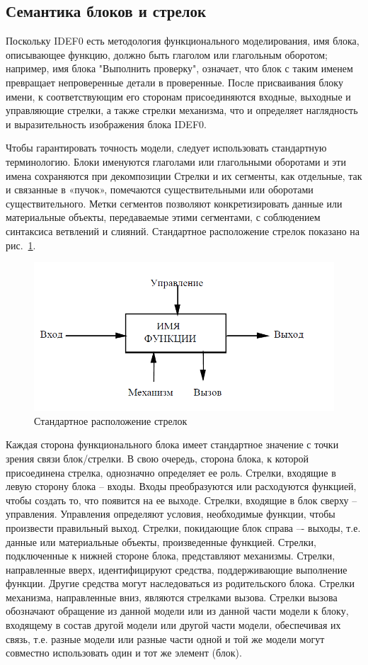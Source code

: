 \documentclass[a4paper, final]{article}
\begin{document}
\subsection{Семантика блоков и стрелок}
Поскольку IDEF0 есть методология функционального моделирования, имя блока, описывающее функцию, должно быть глаголом или глагольным оборотом; например, имя блока "Выполнить проверку", означает, что блок с таким именем превращает непроверенные детали в проверенные. После присваивания блоку имени, к соответствующим его сторонам присоединяются входные, выходные и управляющие стрелки, а также стрелки механизма, что и определяет наглядность и выразительность изображения блока IDEF0. 

Чтобы гарантировать точность модели, следует использовать стандартную
терминологию. Блоки именуются глаголами или глагольными оборотами и эти имена сохраняются при декомпозиции Стрелки и их сегменты, как отдельные, так и связанные в «пучок», помечаются существительными или оборотами существительного. Метки сегментов позволяют конкретизировать данные или материальные объекты, передаваемые этими сегментами, с соблюдением синтаксиса ветвлений и слияний. Стандартное расположение стрелок показано на рис.~\ref{img:semantics}.

\begin{figure}[H]
  \centering
  \includegraphics[width=0.5\linewidth]{semantics.png}
  \caption{Стандартное расположение стрелок}
  \label{img:semantics}
\end{figure}

Каждая сторона функционального блока имеет стандартное значение с точки зрения связи блок/стрелки. В свою очередь, сторона блока, к которой присоединена стрелка, однозначно определяет ее роль. Стрелки, входящие в левую сторону блока -- входы. Входы преобразуются или расходуются функцией, чтобы создать то, что появится на ее выходе. Стрелки, входящие в блок сверху -- управления. Управления определяют условия, необходимые функции, чтобы произвести правильный выход. Стрелки, покидающие блок справа –- выходы, т.е. данные или материальные объекты, произведенные функцией. Стрелки, подключенные к нижней стороне блока, представляют механизмы. Стрелки, направленные вверх, идентифицируют средства, поддерживающие выполнение функции. Другие средства могут наследоваться из родительского блока. Стрелки механизма, направленные вниз, являются стрелками вызова. Стрелки вызова обозначают обращение из данной модели или из данной части модели к блоку, входящему в состав другой модели или другой части модели, обеспечивая их связь, т.е. разные модели или разные части одной и той же модели могут совместно использовать один и тот же элемент (блок). 
\end{document}
